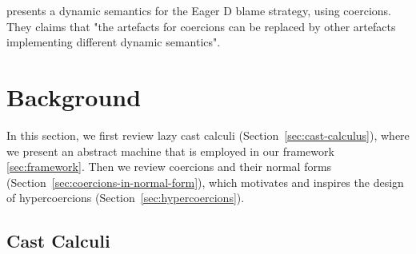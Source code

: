 \documentclass[runningheads]{llncs}
\begin{document}
\citet{garcia2014deriving} presents a dynamic semantics for the Eager D blame 
strategy, using coercions. They claims that "the artefacts for coercions can be
replaced by other artefacts implementing different dynamic semantics".


\section{Background} \label{sec:background}

In this section, we first review lazy cast calculi (Section~\ref{sec:cast-calculus}), where
we present an abstract machine that is employed in our framework \ref{sec:framework}. Then
we review coercions and their normal forms (Section~\ref{sec:coercions-in-normal-form}), which
motivates and inspires the design of hypercoercions (Section~\ref{sec:hypercoercions}).

\subsection{Cast Calculi} \label{sec:cast-calculi}
\end{document}
